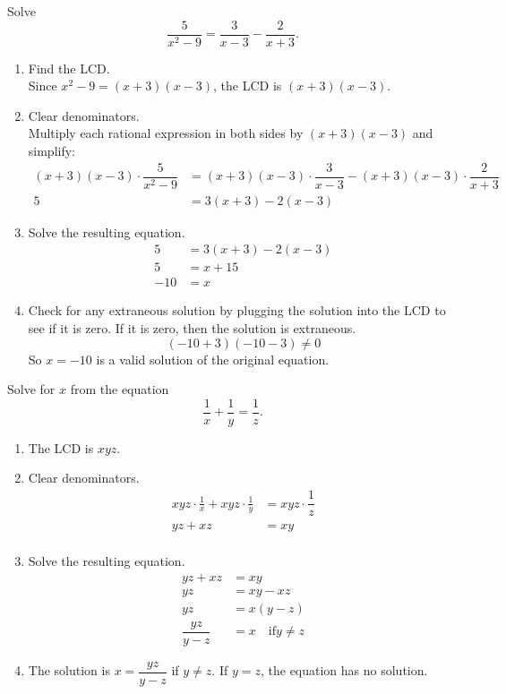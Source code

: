 	\begin{example}
		Solve
		\[
			\dfrac{5}{x^2-9}=\dfrac{3}{x-3}-\dfrac{2}{x+3}.
		\]

		\begin{enumerate}[label={\textbf{\textup{Step \arabic*.}}~}]
			\item Find the LCD.\\
			      Since $x^2-9=(x+3)(x-3)$, the LCD is $(x+3)(x-3)$.
			\item Clear denominators.\\
			      Multiply each rational expression in both sides by $(x+3)(x-3)$ and simplify:
			      \[
				      \begin{split}
					      (x+3)(x-3)\cdot\dfrac{5}{x^2-9}&=(x+3)(x-3)\cdot\dfrac{3}{x-3}-(x+3)(x-3)\cdot\dfrac{2}{x+3}\\
					      5&=3(x+3)-2(x-3)
				      \end{split}
			      \]
			\item Solve the resulting equation.
			      \[
				      \begin{split}
					      5&=3(x+3)-2(x-3)\\
					      5&=x+15\\
					      -10&=x
				      \end{split}
			      \]
			\item Check for any extraneous solution by plugging the solution into the LCD to see if it is zero. If it is zero, then the solution is extraneous.
			      \[
				      (-10+3)(-10-3)\neq 0
			      \]
			      So $x=-10$ is a valid solution of the original equation.
		\end{enumerate}
	\end{example}


	\begin{example}
		Solve for $x$ from the equation
		\[
			\frac{1}{x}+\frac{1}{y}=\dfrac{1}{z}.
		\]

		\begin{enumerate}[label={\textbf{\textup{Step \arabic*.}}~}]
			\item The LCD is $xyz$.
			\item Clear denominators.
			      \[
				      \begin{split}
					      xyz\cdot\frac{1}{x}+xyz\cdot\frac{1}{y}&=xyz\cdot\dfrac{1}{z}\\
					      yz+xz&=xy\\
				      \end{split}
			      \]
			\item Solve the resulting equation.
			      \[
				      \begin{split}
					      yz+xz&=xy\\
					      yz&=xy-xz\\
					      yz&=x(y-z)\\
					      \dfrac{yz}{y-z}&=x \quad \text{if} y\neq z
				      \end{split}
			      \]
			\item The solution is $x=\dfrac{yz}{y-z}$ if $y\neq z$. If $y=z$, the equation has no solution.
		\end{enumerate}
	\end{example}

